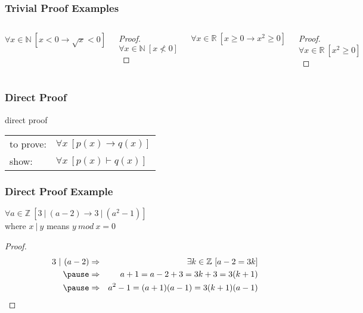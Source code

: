 \documentclass[dvipsnames]{beamer}
\begin{document}
\begin{frame}
  \frametitle{Trivial Proof Examples}

  \begin{columns}[t]
    \begin{theorem}
      $\forall x \in \mathbb{N}~[x < 0 \rightarrow \sqrt{x} < 0]$
    \end{theorem}

    \pause
    \begin{proof}
      $\forall x \in \mathbb{N}~[x \nless 0]$
    \end{proof}

    \pause
    \begin{theorem}
      $\forall x \in \mathbb{R}~[x \geq 0 \rightarrow x^2 \geq 0]$
    \end{theorem}

    \pause
    \begin{proof}
      $\forall x \in \mathbb{R}~[x^2 \geq 0]$
    \end{proof}
  \end{columns}
\end{frame}
%

\begin{frame}
  \frametitle{Direct Proof}

  \begin{block}{direct proof}
    \begin{tabular}{ll}
      to prove: & $\forall x~[p(x) \rightarrow q(x)]$\\
      show:     & $\forall x~[p(x) \vdash q(x)]$
    \end{tabular}
  \end{block}
\end{frame}

\begin{frame}
  \frametitle{Direct Proof Example}

  \begin{theorem}
    $\forall a \in \mathbb{Z}~[3~|~(a-2) \rightarrow 3~|~(a^2-1)]$\\
    where $x~|~y$ means $y~mod~x = 0$
  \end{theorem}

  \pause
  \begin{proof}
    \begin{eqnarray*}
      3~|~(a-2) & \Rightarrow & \exists k \in \mathbb{Z}~[a-2 = 3k]\\\pause
                & \Rightarrow & a+1 = a-2 + 3 = 3k+3 = 3(k+1)\\\pause
                & \Rightarrow & a^2-1 = (a+1)(a-1) = 3(k+1)(a-1)
    \end{eqnarray*}
  \end{proof}
\end{frame}
\end{document}
